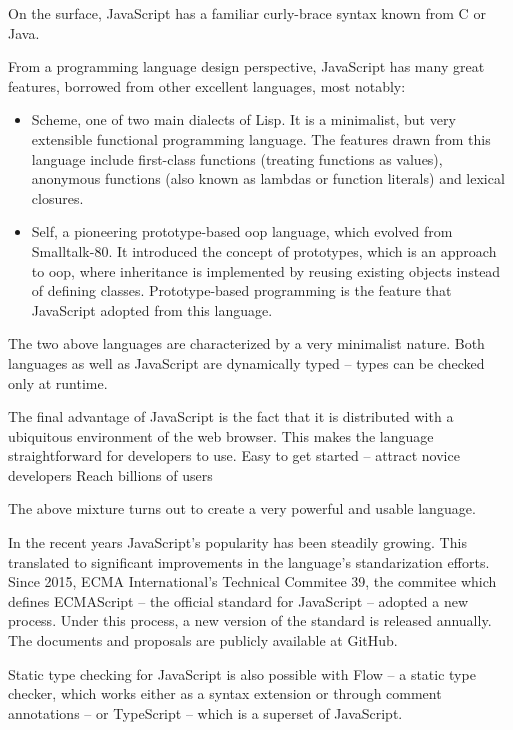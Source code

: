 On the surface, JavaScript has a familiar curly-brace syntax known from C or Java.

From a programming language design perspective, JavaScript has many great
features, borrowed from other excellent languages\cite[Section~4~Overview]{ecmascript}, most notably:
\begin{itemize}
   \item Scheme, one of two main dialects of Lisp\cite{r7rs}. It is a minimalist, but very extensible functional programming language. The features drawn from this language include first-class functions (treating functions as values), anonymous functions (also known as lambdas or function literals) and lexical closures.
   \item Self, a pioneering prototype-based \acrlong{oop} language\cite{self_handbook}, which evolved from Smalltalk-80\cite{smalltalk_history}. It introduced the concept of prototypes, which is an approach to \acrshort{oop}, where inheritance is implemented by reusing existing objects instead of defining classes. Prototype-based programming is the feature that JavaScript adopted from this language.
\end{itemize}
The two above languages are characterized by a very minimalist nature.
Both languages as well as JavaScript\cite{js_types} are dynamically typed -- types can be checked only at runtime. 

The final advantage of JavaScript is the fact that it is distributed with a ubiquitous environment of the web browser. This makes the language straightforward for developers to use.
Easy to get started -- attract novice developers
Reach billions of users\cite{internet_stats}

The above mixture turns out to create a very powerful and usable language.


In the recent years JavaScript's popularity has been steadily growing\cite{js_growth}. This translated to significant improvements in the language's standarization efforts. Since 2015, ECMA International's\cite{ecma} Technical Commitee 39\cite{tc39}, the commitee which defines ECMAScript -- the official standard for JavaScript -- adopted a new process. Under this process, a new version of the standard is released annually\cite{ecmascript, ecmascript_2015, ecmascript_2017}. The documents and proposals are publicly available at GitHub\cite{ecma_github}.


Static type checking for JavaScript is also possible with Flow\cite{js_flow} -- a static type checker, which works either as a syntax extension or through comment annotations -- or TypeScript\cite{typescript} -- which is a superset of JavaScript.


